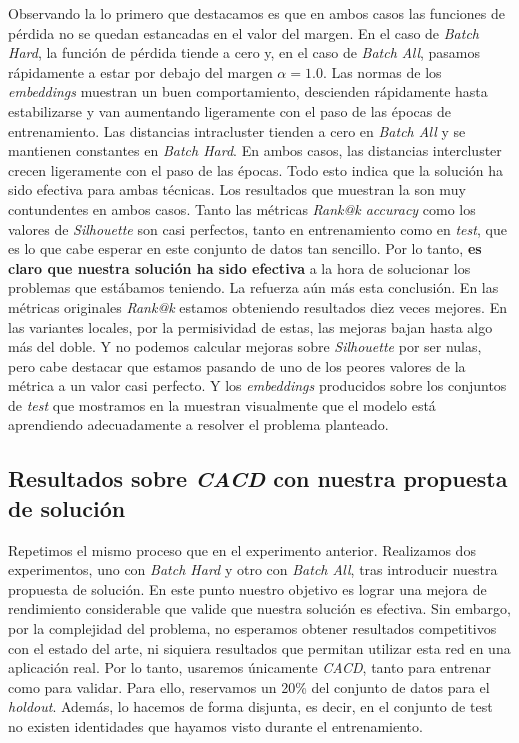 Observando la  lo primero que destacamos es que en ambos casos las funciones de pérdida no se quedan estancadas en el valor del margen. En el caso de \textit{Batch Hard}, la función de pérdida tiende a cero y, en el caso de \textit{Batch All}, pasamos rápidamente a estar por debajo del margen $\alpha = 1.0$. Las normas de los \textit{embeddings} muestran un buen comportamiento, descienden rápidamente hasta estabilizarse y van aumentando ligeramente con el paso de las épocas de entrenamiento. Las distancias intracluster tienden a cero en \textit{Batch All} y se mantienen constantes en \textit{Batch Hard}. En ambos casos, las distancias intercluster crecen ligeramente con el paso de las épocas. Todo esto indica que la solución ha sido efectiva para ambas técnicas. Los resultados que muestran la  son muy contundentes en ambos casos. Tanto las métricas \textit{Rank@k accuracy} como los valores de \textit{Silhouette} son casi perfectos, tanto en entrenamiento como en \textit{test}, que es lo que cabe esperar en este conjunto de datos tan sencillo. Por lo tanto, \textbf{es claro que nuestra solución ha sido efectiva} a la hora de solucionar los problemas que estábamos teniendo. La  refuerza aún más esta conclusión. En las métricas originales \textit{Rank@k} estamos obteniendo resultados diez veces mejores. En las variantes locales, por la permisividad de estas, las mejoras bajan hasta algo más del doble. Y no podemos calcular mejoras sobre \textit{Silhouette} por ser nulas, pero cabe destacar que estamos pasando de uno de los peores valores de la métrica a un valor casi perfecto. Y los \textit{embeddings} producidos sobre los conjuntos de \textit{test} que mostramos en la  muestran visualmente que el modelo está aprendiendo adecuadamente a resolver el problema planteado.

\subsection{Resultados sobre \textit{CACD} con nuestra propuesta de solución} \label{isubsec:experimentacion_cacd_bien}

Repetimos el mismo proceso que en el experimento anterior. Realizamos dos experimentos, uno con \textit{Batch Hard} y otro con \textit{Batch All}, tras introducir nuestra propuesta de solución. En este punto nuestro objetivo es lograr una mejora de rendimiento considerable que valide que nuestra solución es efectiva. Sin embargo, por la complejidad del problema, no esperamos obtener resultados competitivos con el estado del arte, ni siquiera resultados que permitan utilizar esta red en una aplicación real. Por lo tanto, usaremos únicamente \textit{CACD}, tanto para entrenar como para validar. Para ello, reservamos un 20\% del conjunto de datos para el \textit{holdout}. Además, lo hacemos de forma disjunta, es decir, en el conjunto de test no existen identidades que hayamos visto durante el entrenamiento.

